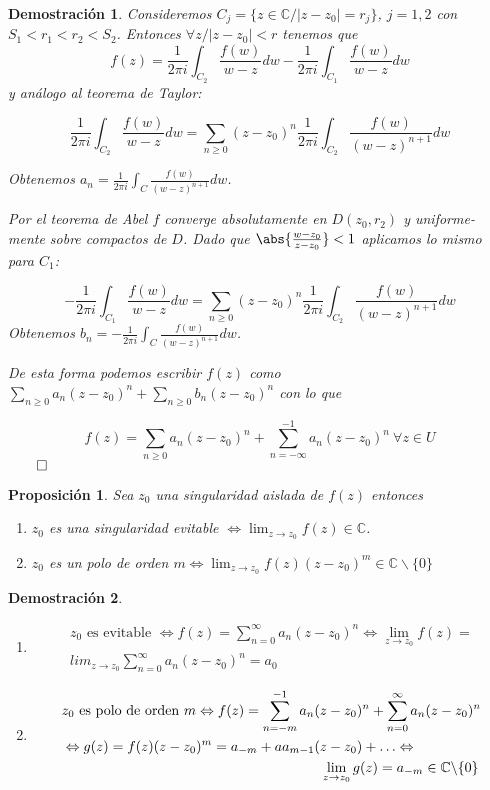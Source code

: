 \documentclass[10pt]{book}
\newtheorem{prop}{Proposición}[chapter]
\newtheorem*{dem}{Demostración}
\newcommand{\C}{\mathbb{C}}
\begin{document}
\begin{dem}
Consideremos $C_j = \{z\in\C / |z-z_0| = r_j\}$, $j= 1,2$ con $S_1 < r_1 < r_2 <S_2$.
Entonces $\forall z / |z-z_0|<r$ tenemos 	que 
$$f(z) = \frac{1}{2\pi i} \int_{C_2} \frac{f(w)}{w-z}dw - \frac{1}{2\pi i} \int_{C_1} \frac{f(w)}{w-z}dw$$
y análogo al teorema de Taylor:

$$\frac{1}{2\pi i} \int_{C_2} \frac{f(w)}{w-z}dw = \sum_{n\geq 0}(z-z_0)^n \frac{1}{2\pi i} \int_{C_2} \frac{f(w)}{(w-z)^{n+1}}dw$$

Obtenemos $a_n = \frac{1}{2\pi i}\int_C \frac{f(w)}{(w-z)^{n+1}}dw$.

Por el teorema de Abel $f$ converge absolutamente en $D(z_0,r_2)$ y uniforme- mente sobre compactos de $D$. Dado que $\abs{\frac{w-z_0}{z-z_0}}<1$ aplicamos lo mismo para $C_1$:

$$-\frac{1}{2\pi i} \int_{C_1} \frac{f(w)}{w-z}dw = \sum_{n\geq 0}(z-z_0)^n \frac{1}{2\pi i} \int_{C_2} \frac{f(w)}{(w-z)^{n+1}}dw$$
Obtenemos $b_n = -\frac{1}{2\pi i}\int_C \frac{f(w)}{(w-z)^{n+1}}dw$.

De esta forma podemos escribir $f(z)$ como $\sum_{n\geq 0} a_n (z-z_0)^n +  \sum_{n\geq 0} b_n (z-z_0)^n$ con lo que 

$$f(z) = \sum_{n\geq 0} a_n (z-z_0)^n +  \sum_{n= -\infty}^{-1} a_n (z-z_0)^n\ \forall z\in U$$$\qed$
\end{dem}

\begin{prop}
Sea $z_0$ una singularidad aislada de $f(z)$ entonces 
\begin{enumerate}
\item $z_0$ es una singularidad evitable $\Leftrightarrow \lim_{z\to z_0} f(z) \in\C$.
\item $z_0$ es un polo de orden $m \Leftrightarrow \lim_{z\to z_0} f(z)(z-z_0)^m \in \C\backslash\{0\}$
\end{enumerate}
\end{prop}

\begin{dem}\ \\
\begin{enumerate}
\item \begin{align*}
	z_0 \text{ es evitable } \Leftrightarrow f(z) = \sum_{n=0}^{\infty} a_n (z-z_0)^n \Leftrightarrow \lim_{z\to z_0} f(z) = \\
	lim_{z\to z_0} \sum_{n=0}^\infty a_n (z-z_0)^n = a_0
	\end{align*}

\item \begin{align*}
&z_0 \text{ es polo de orden } m \Leftrightarrow f(z) = \sum_{n=-m}^{-1} a_n(z-z_0)^n + \sum_{n=0}^\infty a_n (z-z_0)^n\\
&\Leftrightarrow g(z) = f(z)(z-z_0)^m = a_{-m} + aa_{m-1}(z-z_0)+\ldots \Leftrightarrow\\
&\hspace{6.5cm} \lim_{z\to z_0} g(z) = a_{-m}\in \C\backslash\{0\}
\end{align*}
\end{enumerate}
\end{dem}
\end{document}
